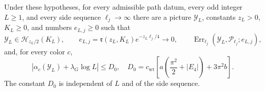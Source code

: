 \begin{theorem}
\label{thm:ex-all-period-recording}
Under these hypotheses, for every admissible path datum, every odd integer
$L\geq1$, and every side sequence $\ell_j\to\infty$ there are a picture
$\mathcal Y_L$, constants
$z_L>0$, $K_L\geq0$, and numbers $e_{L,j}\geq0$ such that
\begin{equation}
 \mathcal Y_L\in\mathcal H_{z_L/2}(K_L),\qquad
 e_{L,j}=\mathfrak r(z_L,K_L)e^{-z_L\ell_j/4}\longrightarrow0,
 \qquad
 \operatorname{Err}_{\ell_j}(\mathcal Y_L,\mathcal P_{\ell_j};e_{L,j}),
 \label{eq:annulus-recording-yield-display-RY10}
\end{equation}
and, for every color $c$,
\begin{equation}
 \left|\alpha_c(\mathcal Y_L)+\lambda_G\log L\right|
 \leq D_0,
 \quad D_0=c_{\mathrm{wt}}\left[
     a\left(\frac{\pi^2}{2}+|E_4|\right)+3\pi^2 b\right].
 \label{eq:annulus-recording-yield-display-RY11}
\end{equation}
The constant $D_0$ is independent of $L$ and of the side sequence.
\end{theorem}
